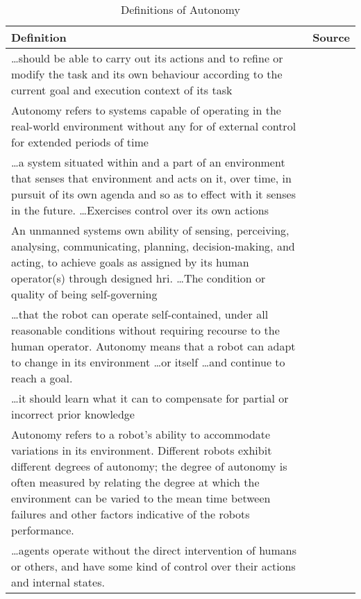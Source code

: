\begin{table}\centering
  \caption{Definitions of Autonomy}
  \label{tab:autonomy_definitions}
  \begin{tabularx}{\textwidth}{X p{3cm}}\toprule
    Definition & Source \\ \midrule
    \ldots should be able to carry out its actions and to refine or modify the task and its own behaviour according to the current goal and execution context of its task &~\citet{Alami1998}\\
    Autonomy refers to systems capable of operating in the real-world environment without any for of external control for extended periods of time &~\citet{Bekey2005}\\
    \ldots a system situated within and a part of an environment that senses that environment and acts on it, over time, in pursuit of its own agenda and so as to effect with it senses in the future. \ldots Exercises control over its own actions &~\citet{Franklin1997} \\
    An unmanned systems own ability of sensing, perceiving, analysing, communicating, planning, decision-making, and acting, to achieve goals as assigned by its human operator(s) through designed \gls{hri}. \ldots The condition or quality of being self-governing &~\citet{Huang2004}\\
    \ldots that the robot can operate self-contained, under all reasonable conditions without requiring recourse to the human operator. Autonomy means that a robot can adapt to change in its environment \ldots or itself \ldots and continue to reach a goal. &~\citet{Murphy2000}\\
    \ldots it should learn what it can to compensate for partial or incorrect prior knowledge &~\citet{Russell2009} \\
    Autonomy refers to a robot's ability to accommodate variations in its environment. Different robots exhibit different degrees of autonomy; the degree of autonomy is often measured by relating the degree at which the environment can be varied to the mean time between failures and other factors indicative of the robots performance. &~\citet{Thrun2004}\\
    \ldots agents operate without the direct intervention of humans or others, and have some kind of control over their actions and internal states. &~\citet{Wooldridge1995}\\\bottomrule
  \end{tabularx}
\end{table}

